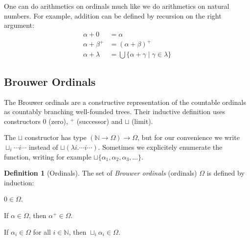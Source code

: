 \documentclass[11pt,oneside,a4paper,final]{report}
\theoremstyle{definition}
\newtheorem{definition}{Definition}
\begin{document}

One can do arithmetics on ordinals much like we do arithmetics on natural
numbers. For example, addition can be defined by recursion on the right
argument:
\begin{align*}
  \alpha + 0       &= \alpha\\
  \alpha + \beta^+ &= (\alpha + \beta)^+\\
  \alpha + \lambda &= \bigcup \{ \alpha + \gamma \; | \; \gamma \in \lambda \}
\end{align*}



\subsection{Brouwer Ordinals}\label{sub:brouwer}

The Brouwer ordinals are a constructive representation of the countable
ordinals as countably branching well-founded trees. Their inductive definition
uses constructors $0$ (zero), $^+$ (successor) and $\sqcup$ (limit).

The $\sqcup$ constructor has type $(\mathbb{N} \rightarrow \Omega) \rightarrow
\Omega$, but for our convenience we write $\sqcup_i \cdots i \cdots$ instead
of $\sqcup (\lambda i . \cdots i \cdots)$. Sometimes we explicitely enumerate
the function, writing for example $\sqcup \{ \alpha_1, \alpha_2, \alpha_3,
\ldots \}$.

\begin{definition}[Ordinals]
The set of \emph{Brouwer ordinals} (ordinals) $\Omega$ is defined by
induction:
\begin{compactenum}
  \item
    $0 \in \Omega$.
  \item
    If $\alpha \in \Omega$, then $\alpha^+ \in \Omega$.
  \item
    If $\alpha_i \in \Omega$ for all $i \in \mathbb{N}$, then $\sqcup_i
    \alpha_i \in \Omega$.
\end{compactenum}
\end{definition}
\end{document}
